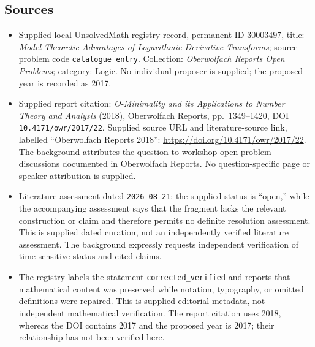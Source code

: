 \documentclass[11pt]{article}
\begin{document}
\subsection{Sources}
\begin{itemize}
\item Supplied local UnsolvedMath registry record, permanent ID \(30003497\), title: \emph{Model-Theoretic Advantages of Logarithmic-Derivative Transforms}; source problem code \texttt{catalogue entry}. Collection: \emph{Oberwolfach Reports Open Problems}; category: Logic. No individual proposer is supplied; the proposed year is recorded as 2017.
\item Supplied report citation: \emph{O-Minimality and its Applications to Number Theory and Analysis} (2018), Oberwolfach Reports, pp.\ 1349--1420, DOI \texttt{10.4171/owr/2017/22}. Supplied source URL and literature-source link, labelled ``Oberwolfach Reports 2018'': \url{https://doi.org/10.4171/owr/2017/22}. The background attributes the question to workshop open-problem discussions documented in Oberwolfach Reports. No question-specific page or speaker attribution is supplied.
\item Literature assessment dated \texttt{2026-08-21}: the supplied status is ``open,'' while the accompanying assessment says that the fragment lacks the relevant construction or claim and therefore permits no definite resolution assessment. This is supplied dated curation, not an independently verified literature assessment. The background expressly requests independent verification of time-sensitive status and cited claims.
\item The registry labels the statement \texttt{corrected\_verified} and reports that mathematical content was preserved while notation, typography, or omitted definitions were repaired. This is supplied editorial metadata, not independent mathematical verification. The report citation uses 2018, whereas the DOI contains 2017 and the proposed year is 2017; their relationship has not been verified here.
\end{itemize}
\end{document}

